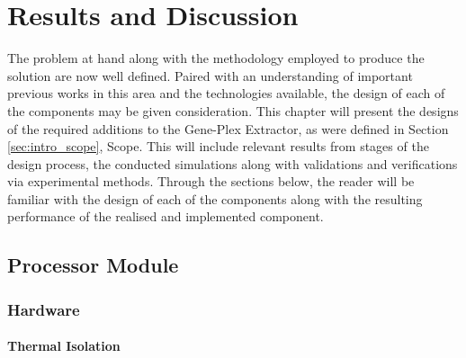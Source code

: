 \chapter{Results and Discussion}
\label{cha:results}

The problem at hand along with the methodology employed to produce the solution are now well defined. Paired with an understanding of important previous works in this area and the technologies available, the design of each of the components may be given consideration. This chapter will present the designs of the required additions to the Gene-Plex Extractor, as were defined in Section \ref{sec:intro_scope}, Scope. This will include relevant results from stages of the design process, the conducted simulations along with validations and verifications via experimental methods. Through the sections below, the reader will be familiar with the design of each of the components along with the resulting performance of the realised and implemented component.\\

\section{Processor Module}

\subsection{Hardware}

\subsubsection{Thermal Isolation}
\label{sec:isolation}


